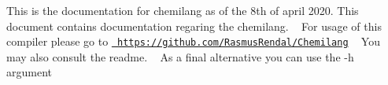 This is the documentation for chemilang as of the 8th of april 2020. This document contains documentation regaring the chemilang. ~\newline
For usage of this compiler please go to \href{https://github.com/RasmusRendal/Chemilang}{\texttt{ https\+://github.\+com/\+Rasmus\+Rendal/\+Chemilang}} ~\newline
 You may also consult the readme. ~\newline
As a final alternative you can use the -\/h argument 